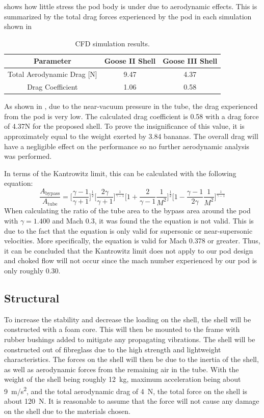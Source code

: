 \documentclass[main.tex]{subfiles}
\begin{document}
 shows how little stress the pod body is under due to aerodynamic effects. This is summarized by the total drag forces experienced by the pod in each simulation shown in 
\begin{table}[h!]
\centering
\begin{tabular}{c c c} 
\hline
Parameter & Goose II Shell & Goose III Shell \\
\hline
Total Aerodynamic Drag [N] & 9.47 & 4.37\\
Drag Coefficient & 1.06 & 0.58\\
\hline
\end{tabular}
\caption{CFD simulation results.}
\label{table:aerotable2}
\end{table}
As shown in , due to the near-vacuum pressure in the tube, the drag experienced from the pod is very low. The calculated drag coefficient is 0.58 with a drag force of 4.37N for the proposed shell. To prove the insignificance of this value, it is approximately equal to the weight exerted by 3.84 bananas. The overall drag will have a negligible effect on the performance so no further aerodynamic analysis was performed.

In terms of the Kantrowitz limit, this can be calculated with the following equation:
\begin{equation}
\frac{A_{\textrm{bypass}}}{A_{\textrm{tube}}}=\bigg[\frac{\gamma - 1}{\gamma + 1}\bigg]^{\frac{1}{2}}\bigg[\frac{2\gamma}{\gamma + 1}\bigg]^{\frac{1}{\gamma - 1}}\bigg[1 + \frac{2}{\gamma - 1}\frac{1}{M^{2}}\bigg]^{\frac{1}{2}}\bigg[1 - \frac{\gamma - 1}{2\gamma}\frac{1}{M^{2}}\bigg]^{\frac{1}{\gamma - 1}}
\end{equation}
When calculating the ratio of the tube area to the bypass area around the pod with $\gamma= 1.400$ and Mach 0.3, it was found the the equation is not valid. This is due to the fact that the equation is only valid for supersonic or near-supersonic velocities. More specifically, the equation is valid for Mach 0.378 or greater. Thus, it can be concluded that the Kantrowitz limit does not apply to our pod design and choked flow will not occur since the mach number experienced by our pod is only roughly 0.30.\\

    \subsection{Structural}
To increase the stability and decrease the loading on the shell, the shell will be constructed with a foam core. This will then be mounted to the frame with rubber bushings added to mitigate any propagating vibrations. The shell will be constructed out of fibreglass due to the high strength and lightweight characteristics. The forces on the shell will then be due to the inertia of the shell, as well as aerodynamic forces from the remaining air in the tube. With the weight of the shell being roughly \SI{12}{kg}, maximum acceleration being about \SI{9}{m/s^2}, and the total aerodynamic drag of \SI{4}{N}, the total force on the shell is about \SI{120}{N}. It is reasonable to assume that the force will not cause any damage on the shell due to the materials chosen. 
\end{document}
